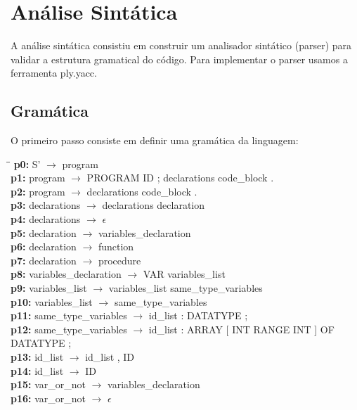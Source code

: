 \documentclass[12pt,a4paper]{report}
\begin{document}
\chapter{Análise Sintática}

A análise sintática consistiu em construir um analisador sintático (parser) para validar a estrutura gramatical do código. Para implementar o parser usamos a ferramenta ply.yacc.

\section{Gramática}
O primeiro passo consiste em definir uma gramática da linguagem:

\begin{tabbing}
\hspace{1.3cm}\= \hspace{11cm}\= \kill
\textbf{p0:}  \> S' \(\to\) program \\
\textbf{p1:}  \> program \(\to\) PROGRAM ID ; declarations code\_block . \\
\textbf{p2:}  \> program \(\to\) declarations code\_block . \\
\textbf{p3:}  \> declarations \(\to\) declarations declaration \\
\textbf{p4:}  \> declarations \(\to\) \(\epsilon\) \\
\textbf{p5:}  \> declaration \(\to\) variables\_declaration \\
\textbf{p6:}  \> declaration \(\to\) function \\
\textbf{p7:}  \> declaration \(\to\) procedure \\
\textbf{p8:}  \> variables\_declaration \(\to\) VAR variables\_list \\
\textbf{p9:}  \> variables\_list \(\to\) variables\_list same\_type\_variables \\
\textbf{p10:} \> variables\_list \(\to\) same\_type\_variables \\
\textbf{p11:} \> same\_type\_variables \(\to\) id\_list : DATATYPE ; \\
\textbf{p12:} \> same\_type\_variables \(\to\) id\_list : ARRAY [ INT RANGE INT ] OF DATATYPE ; \\
\textbf{p13:} \> id\_list \(\to\) id\_list , ID \\
\textbf{p14:} \> id\_list \(\to\) ID \\
\textbf{p15:} \> var\_or\_not \(\to\) variables\_declaration \\
\textbf{p16:} \> var\_or\_not \(\to\) \(\epsilon\) \\

\end{tabbing}
\end{document}
